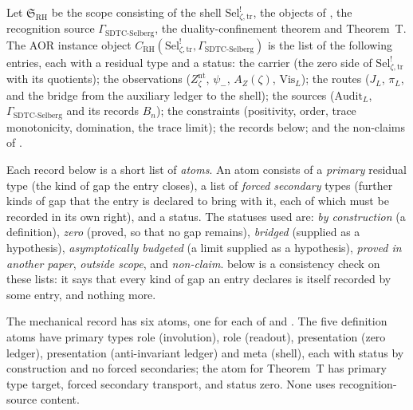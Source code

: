 \documentclass[11pt]{article}
\newcommand{\JL}{J_{L}}
\newcommand{\psimRH}{\psi_{-}}
\newcommand{\Znt}{Z_{\zeta}^{\mathrm{nt}}}
\newcommand{\AZ}{A_{Z}(\zeta)}
\newcommand{\Sel}{\mathrm{Sel}^{!}_{\zeta,\mathrm{tr}}}
\newcommand{\GamSDTCSelberg}{\Gamma_{\mathrm{SDTC\text{-}Selberg}}}
\theoremstyle{definition}
\begin{document}
\begin{definition}[The AOR instance object attached to \(\Sel\)]
\label{def:rh:aor-sel-instance}
Let \(\mathfrak S_{\mathrm{RH}}\) be the scope consisting of the shell
\(\Sel\), the objects of , the
recognition source \(\GamSDTCSelberg\), the duality-confinement theorem
and Theorem~T.  The AOR instance object
\(C_{\mathrm{RH}}(\Sel,\GamSDTCSelberg)\) is the list of the following
entries, each with a residual type and a status:
the carrier (the zero side of \(\Sel\) with its quotients); the
observations (\(\Znt\), \(\psimRH\), \(\AZ\), \(\mathrm{Vis}_L\)); the
routes (\(\JL\), \(\pi_L\), and the bridge from the auxiliary ledger to
the shell); the sources (\(\mathrm{Audit}_L\), \(\GamSDTCSelberg\) and
its records \(B_n\)); the constraints (positivity, order, trace
monotonicity, domination, the trace limit); the records 
below; and the non-claims of .
\end{definition}

Each record below is a short list of \emph{atoms}.  An atom consists of
a \emph{primary} residual type (the kind of gap the entry closes), a
list of \emph{forced secondary} types (further kinds of gap that the
entry is declared to bring with it, each of which must be recorded in
its own right), and a status.  The statuses used are: \emph{by construction} (a definition),
\emph{zero} (proved, so that no gap remains), \emph{bridged} (supplied
as a hypothesis), \emph{asymptotically budgeted} (a limit supplied as a
hypothesis), \emph{proved in another paper}, \emph{outside scope}, and
\emph{non-claim}.   below is a consistency
check on these lists: it says that every kind of gap an entry declares
is itself recorded by some entry, and nothing more.

\begin{classification}
\label{thm:rh:aor-mechanical-records}
The mechanical record has six atoms, one for each of
and .  The five definition atoms have
primary types role (involution), role (readout), presentation (zero
ledger), presentation (anti-invariant ledger) and meta (shell), each
with status by construction and no forced secondaries; the atom for
Theorem~T has primary type target, forced secondary transport, and
status zero.  None uses recognition-source content.
\end{classification}
\end{document}
